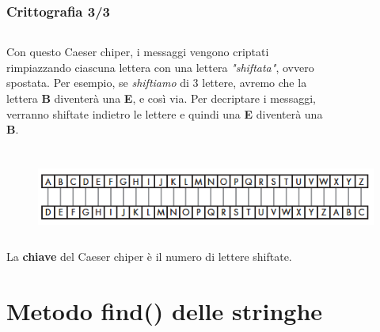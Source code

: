 \documentclass{beamer}
\begin{document}
\begin{frame}[fragile]
\frametitle{Crittografia 3/3}

\begin{columns}[T]
	\begin{column}[T]{0.6\textwidth}
		Con questo Caeser chiper, i messaggi vengono criptati rimpiazzando ciascuna lettera con una lettera \textit{"shiftata"}, ovvero spostata.\newline
		Per esempio, se \textit{shiftiamo} di 3 lettere, avremo che la lettera \textbf{B} diventerà una \textbf{E}, e così via. Per decriptare i messaggi, verranno shiftate indietro le lettere e quindi una \textbf{E} diventerà una \textbf{B}.	
	\end{column}
	\begin{column}[T]{0.4\textwidth}
		\begin{figure}[t]
			\includegraphics[height=2.7cm, width=\textwidth]{images/Caesar.png}
		\end{figure}
	\end{column}
\end{columns}
\begin{figure}[t]
	\includegraphics[height=2.5cm, width=\textwidth]{images/AlfabetoCaeser.png}
\end{figure}
La \textbf{chiave} del Caeser chiper è il numero di lettere shiftate.
\end{frame}


\section{Metodo find() delle stringhe}
\end{document}
